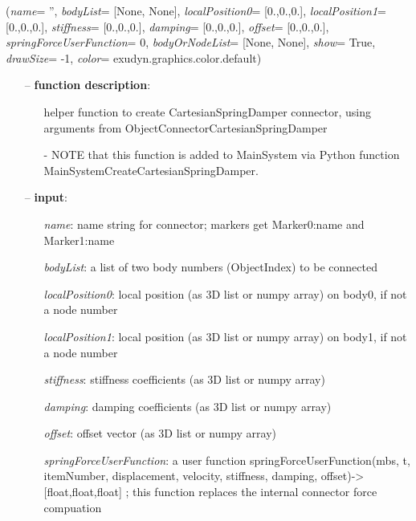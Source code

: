 %
\begin{flushleft}
\label{sec:mainsystemextensions:CreateCartesianSpringDamper}
({\it name}= '', {\it bodyList}= [None, None], {\it localPosition0}= [0.,0.,0.], {\it localPosition1}= [0.,0.,0.], {\it stiffness}= [0.,0.,0.], {\it damping}= [0.,0.,0.], {\it offset}= [0.,0.,0.], {\it springForceUserFunction}= 0, {\it bodyOrNodeList}= [None, None], {\it show}= True, {\it drawSize}= -1, {\it color}= exudyn.graphics.color.default)
\end{flushleft}
\setlength{\itemindent}{0.7cm}
\begin{itemize}[leftmargin=0.7cm]
\item[--]
{\bf function description}: \vspace{-6pt}
\begin{itemize}[leftmargin=1.2cm]
\setlength{\itemindent}{-0.7cm}
\item[]helper function to create CartesianSpringDamper connector, using arguments from ObjectConnectorCartesianSpringDamper
\item[]- NOTE that this function is added to MainSystem via Python function MainSystemCreateCartesianSpringDamper.
\end{itemize}
\item[--]
{\bf input}: \vspace{-6pt}
\begin{itemize}[leftmargin=1.2cm]
\setlength{\itemindent}{-0.7cm}
\item[]{\it name}: name string for connector; markers get Marker0:name and Marker1:name
\item[]{\it bodyList}: a list of two body numbers (ObjectIndex) to be connected
\item[]{\it localPosition0}: local position (as 3D list or numpy array) on body0, if not a node number
\item[]{\it localPosition1}: local position (as 3D list or numpy array) on body1, if not a node number
\item[]{\it stiffness}: stiffness coefficients (as 3D list or numpy array)
\item[]{\it damping}: damping coefficients (as 3D list or numpy array)
\item[]{\it offset}: offset vector (as 3D list or numpy array)
\item[]{\it springForceUserFunction}: a user function springForceUserFunction(mbs, t, itemNumber, displacement, velocity, stiffness, damping, offset)->[float,float,float] ; this function replaces the internal connector force compuation

\end{itemize}
\end{itemize}
